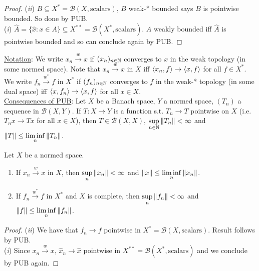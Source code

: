 \documentclass{article}
\begin{document}
\begin{proof}
    \noindent (\textit{ii}) $B\subseteq X^*=\mathcal{B}(X, \text{scalars})$, $B$ weak-* bounded says $B$ is pointwise bounded. So done by PUB.\\
    \noindent (\textit{i}) $\hat{A}=\{\hat{x}:x\in A\}\subseteq X^{**}=\mathcal{B}(X^*, \text{scalars})$. $A$ weakly bounded iff $\hat{A}$ is pointwise bounded and so can conclude again by PUB.
\end{proof}

\noindent\underline{Notation}: We write $x_n\xrightarrow{w}x$ if $(x_n)_{n\in\mathbb{N}}$ converges to $x$ in the weak topology (in some normed space). Note that $x_n\xrightarrow{w}x$ in $X$ iff $\langle x_n, f\rangle\rightarrow\langle x, f\rangle$ for all $f\in X^*$. We write $f_n\xrightarrow{w^*}f$ in $X^*$ if $(f_n)_{n\in\mathbb{N}}$ converges to $f$ in the weak-* topology (in some dual space) iff $\langle x, f_n\rangle\rightarrow\langle x, f\rangle$ for all $x\in X$.\\

\noindent\underline{Consequences of PUB}: Let $X$ be a Banach space, $Y$ a normed space, $(T_n)$ a sequence in $\mathcal{B}(X, Y)$. If $T:X\to Y$ is a function s.t. $T_n\to T$ pointwise on $X$ (i.e. $T_nx\to Tx$ for all $x\in X$), then $T\in\mathcal{B}(X, X)$, $\displaystyle\sup_{n\in\mathbb{N}}\left\lVert T_n\right\rVert<\infty$ and $\left\lVert T\right\rVert\leq \displaystyle\liminf_n\left\lVert T_n\right\rVert$.

\begin{boxprop}\label{prop: weak convergence}
    Let $X$ be a normed space. 
    \begin{enumerate}[label = (\roman*), align = left]
        \item If $x_n\xrightarrow{w}x$ in $X$, then $\displaystyle\sup_{n}\left\lVert x_n\right\rVert<\infty$ and $\left\lVert x\right\rVert\leq \displaystyle\liminf_n\left\lVert x_n\right\rVert$.
        \item If $f_n\xrightarrow{w^*}f$ in $X^*$ and $X$ is complete, then $\displaystyle\sup_{n}\left\lVert f_n\right\rVert<\infty$ and $\left\lVert f\right\rVert\leq \displaystyle\liminf_n\left\lVert f_n\right\rVert$.
    \end{enumerate}
\end{boxprop}

\begin{proof}
    (\textit{ii}) We have that $f_n\to f$ pointwise in $X^*=\mathcal{B}(X, \text{scalars})$. Result follows by PUB.\\
    (\textit{i}) Since $x_n\xrightarrow{w}x$, $\hat{x}_n\rightarrow\hat{x}$ pointwise in $X^{**}=\mathcal{B}(X^*, \text{scalars})$ and we conclude by PUB again.
\end{proof}
\end{document}
